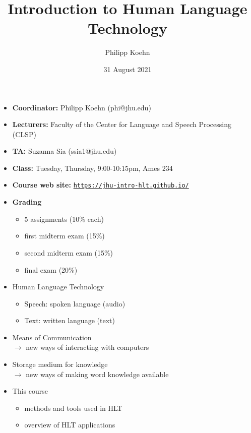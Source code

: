 \documentclass[landscape]{jhuslides3C}
\begin{document}
\rm
\title[Introduction to Human Language Technology: Introduction]{Introduction to Human Language Technology}
\author[Philipp Koehn]{Philipp Koehn}
\date{31 August 2021}
\maketitle


\vfill
\begin{itemize} \itemsep 0mm
\item \textbf{Coordinator:} Philipp Koehn (phi@jhu.edu)
\item \textbf{Lecturers:} Faculty of the Center for Language and Speech Processing (CLSP)
\item \textbf{TA:} Suzanna Sia (ssia1@jhu.edu)
\item \textbf{Class:} Tuesday, Thursday, 9:00-10:15pm, Ames 234
\item \textbf{Course web site:} \href{https://jhu-intro-hlt.github.io/}{\tt https://jhu-intro-hlt.github.io/}
\item \textbf{Grading} \vspace{-3mm}
\begin{itemize}
\item 5 assignments (10\% each)
\item first midterm exam (15\%)
\item second midterm exam (15\%)
\item final exam (20\%)
\end{itemize}
\end{itemize}
\vfill


\vfill
\begin{itemize}
\item Human Language Technology
\begin{itemize}
\item Speech: spoken language (audio)
\item Text: written language (text)
\end{itemize}
\item Means of Communication\\
$\rightarrow$ new ways of interacting with computers
\item Storage medium for knowledge\\
$\rightarrow$ new ways of making word knowledge available
\item This course
\begin{itemize}
\item methods and tools used in HLT
\item overview of HLT applications
\end{itemize}
\end{itemize}
\vfill
\end{document}
